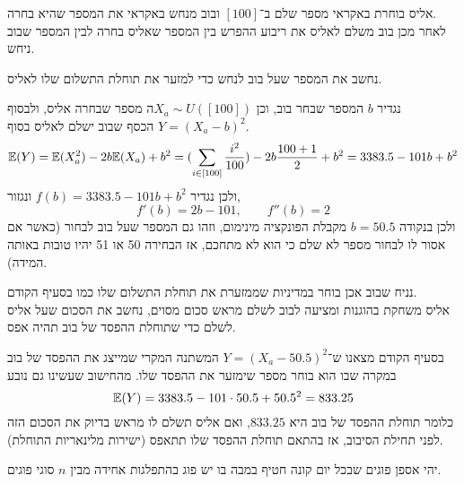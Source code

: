 \question{}
אליס בוחרת באקראי מספר שלם ב־$[100]$ ובוב מנחש באקראי את המספר שהיא בחרה. \\
לאחר מכן בוב משלם לאליס את ריבוע ההפרש בין המספר שאליס בחרה לבין המספר שבוב ניחש.

\subquestion{}
נחשב את המספר שעל בוב לנחש כדי למזער את תוחלת התשלום שלו לאליס.
\begin{solution}
	נגדיר $b$ המספר שבחר בוב, וכן $X_a \sim U([100])$ה מספר שבחרה אליס, ולבסוף $Y = {(X_a - b)}^2$ הכסף שבוב ישלם לאליס בסוף.
	\[
		\mathbb{E}(Y)
		= \mathbb{E}(X_a^2) - 2b \mathbb{E}(X_a) + b^2
		= (\sum_{i \in [100]} \frac{i^2}{100}) - 2b \frac{100 + 1}{2} + b^2
		= 3383.5 - 101b + b^2
	\]
	ולכן נגדיר $f(b) = 3383.5 - 101b + b^2$ ונגזור,
	\[
		f'(b) = 2b - 101,
		\qquad
		f''(b) = 2
	\]
	ולכן בנקודה $b = 50.5$ מקבלת הפונקציה מינימום, וזהו גם המספר שעל בוב לבחור (כאשר אם אסור לו לבחור מספר לא שלם כי הוא לא מתחכם, אז הבחירה 50 או 51 יהיו טובות באותה המידה).
\end{solution}

\subquestion{}
נניח שבוב אכן בוחר במדיניות שממזערת את תוחלת התשלום שלו כמו בסעיף הקודם. \\
אליס משחקת בהוגנות ומציעה לבוב לשלם מראש סכום מסוים, נחשב את הסכום שעל אליס לשלם כדי שתוחלת ההפסד של בוב תהיה אפס.
\begin{solution}
	בסעיף הקודם מצאנו ש־$Y = {(X_a - 50.5)}^2$ המשתנה המקרי שמייצג את ההפסד של בוב במקרה שבו הוא בוחר מספר שימזער את ההפסד שלו.
	מהחישוב שעשינו גם נובע
	\[
		\mathbb{E}(Y)
		= 3383.5 - 101 \cdot 50.5 + 50.5^2
		= 833.25
	\]
	כלומר תוחלת ההפסד של בוב היא $833.25$, ואם אליס תשלם לו מראש בדיוק את הסכום הזה לפני תחילת הסיבוב, אז בהתאם תוחלת ההפסד שלו תתאפס (ישירות מלינאריות התוחלת).
\end{solution}

\question{}
יהי אספן פוגים שבכל יום קונה חטיף במבה בו יש פוג בהתפלגות אחידה מבין $n$ סוגי פוגים.

